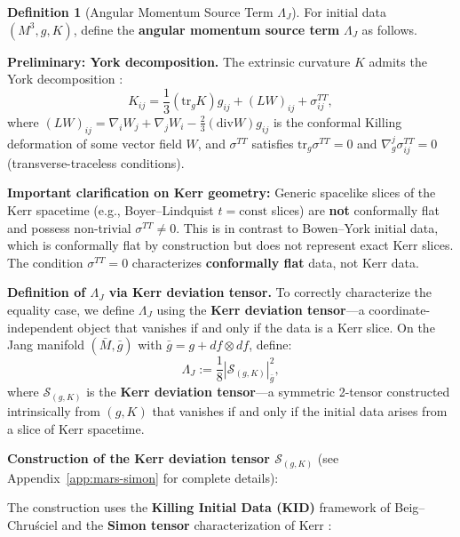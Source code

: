 \documentclass[12pt]{article}
\theoremstyle{plain}
\theoremstyle{definition}
\newtheorem{definition}[theorem]{Definition}
\theoremstyle{remark}
\newcommand{\tr}{\mathrm{tr}}
\newcommand{\Div}{\mathrm{div}}
\newcommand{\bg}{\bar{g}}
\newcommand{\bM}{\bar{M}}
\begin{document}
\begin{definition}[Angular Momentum Source Term $\Lambda_J$]\label{def:Lambda-J}
For initial data $(M^3, g, K)$, define the \textbf{angular momentum source term} $\Lambda_J$ as follows. 

\textbf{Preliminary: York decomposition.} The extrinsic curvature $K$ admits the York decomposition \cite{york1973}:
\[
K_{ij} = \frac{1}{3}(\tr_g K)g_{ij} + (LW)_{ij} + \sigma^{TT}_{ij},
\]
where $(LW)_{ij} = \nabla_i W_j + \nabla_j W_i - \frac{2}{3}(\Div W)g_{ij}$ is the conformal Killing deformation of some vector field $W$, and $\sigma^{TT}$ satisfies $\tr_g \sigma^{TT} = 0$ and $\nabla^j_g \sigma^{TT}_{ij} = 0$ (transverse-traceless conditions).

\textbf{Important clarification on Kerr geometry:} Generic spacelike slices of the Kerr spacetime (e.g., Boyer--Lindquist $t = \mathrm{const}$ slices) are \textbf{not} conformally flat and possess non-trivial $\sigma^{TT} \neq 0$. This is in contrast to Bowen--York initial data, which is conformally flat by construction but does not represent exact Kerr slices. The condition $\sigma^{TT} = 0$ characterizes \textbf{conformally flat} data, not Kerr data.

\textbf{Definition of $\Lambda_J$ via Kerr deviation tensor.} To correctly characterize the equality case, we define $\Lambda_J$ using the \textbf{Kerr deviation tensor}---a coordinate-independent object that vanishes if and only if the data is a Kerr slice. On the Jang manifold $(\bM, \bg)$ with $\bg = g + df \otimes df$, define:
\begin{equation}\label{eq:Lambda-J-def}
\Lambda_J := \frac{1}{8}|\mathcal{S}_{(g,K)}|^2_{\bg},
\end{equation}
where $\mathcal{S}_{(g,K)}$ is the \textbf{Kerr deviation tensor}---a symmetric 2-tensor constructed intrinsically from $(g, K)$ that vanishes if and only if the initial data arises from a slice of Kerr spacetime.

\textbf{Construction of the Kerr deviation tensor $\mathcal{S}_{(g,K)}$} (see Appendix~\ref{app:mars-simon} for complete details):

The construction uses the \textbf{Killing Initial Data (KID)} framework of Beig--Chru\'sciel \cite{beigchrusciel1996} and the \textbf{Simon tensor} characterization of Kerr \cite{simon1984, backdahl2010a, backdahl2010b}:


\end{definition}
\end{document}
